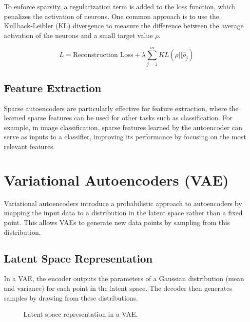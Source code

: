 \documentclass{article}
\begin{document}
To enforce sparsity, a regularization term is added to the loss function, which penalizes the activation of neurons. One common approach is to use the Kullback-Leibler (KL) divergence to measure the difference between the average activation of the neurons and a small target value \( \rho \).

\[
L = \text{Reconstruction Loss} + \lambda \sum_{j=1}^{m} KL(\rho || \hat{\rho}_j)
\]

\subsection{Feature Extraction}

Sparse autoencoders are particularly effective for feature extraction, where the learned sparse features can be used for other tasks such as classification. For example, in image classification, sparse features learned by the autoencoder can serve as inputs to a classifier, improving its performance by focusing on the most relevant features.

\section{Variational Autoencoders (VAE)}

Variational autoencoders introduce a probabilistic approach to autoencoders by mapping the input data to a distribution in the latent space rather than a fixed point. This allows VAEs to generate new data points by sampling from this distribution.

\subsection{Latent Space Representation}

In a VAE, the encoder outputs the parameters of a Gaussian distribution (mean and variance) for each point in the latent space. The decoder then generates samples by drawing from these distributions.

\begin{figure}[h]
    \centering
    \caption{Latent space representation in a VAE.}
    \label{fig:vae}
\end{figure}
\end{document}
